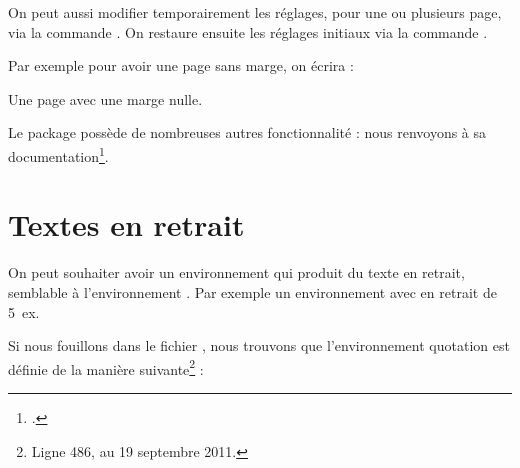 \begin{latexcode}
\usepackage[lmargin=1cm,rmargin=1cm,tmargin=1cm,bmargin=1cm]{geometry}
\end{latexcode}

On peut aussi modifier temporairement les réglages, pour une ou plusieurs page, via la commande . On restaure ensuite les réglages initiaux  via la commande .

Par exemple pour avoir une page sans marge, on écrira :

\begin{latexcode}
Une page avec une marge nulle.
\newpage
\restoregeometry

\end{latexcode}

Le package  possède de nombreuses autres fonctionnalité : nous renvoyons à sa documentation\footcite{geometry}.

\section{Textes en retrait}

On peut souhaiter avoir un environnement qui produit du texte en retrait, semblable à l'environnement . Par exemple un environnement  avec en retrait de 5~ex.

Si nous fouillons dans le fichier , nous trouvons que l'environnement quotation est définie de la manière suivante\footnote{Ligne 486, au 19 septembre 2011.} :

\begin{latexcode}
\newenvironment{quotation}
               {\list{}{\listparindent 1.5em%
                        \itemindent    \listparindent
                        \rightmargin   \leftmargin
                        \parsep        \z@ \@plus\p@}%
                \item\relax}
               {\endlist}
\end{latexcode}

